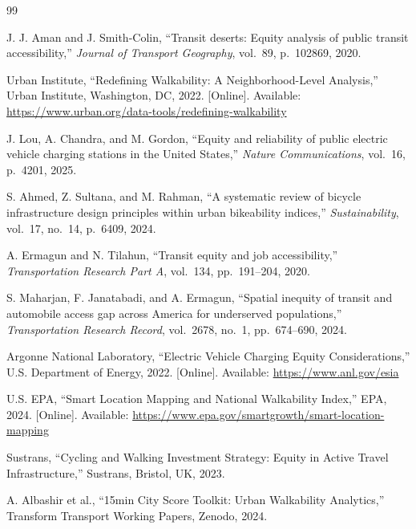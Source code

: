 \documentclass[11pt]{article}
\begin{document}
\small
\begin{thebibliography}{99}
\setlength{\itemsep}{1pt}

 J. J. Aman and J. Smith-Colin, ``Transit deserts: Equity analysis of public transit accessibility,'' \textit{Journal of Transport Geography}, vol.~89, p.~102869, 2020.

 Urban Institute, ``Redefining Walkability: A Neighborhood-Level Analysis,'' Urban Institute, Washington, DC, 2022. [Online]. Available: \url{https://www.urban.org/data-tools/redefining-walkability}

 J. Lou, A. Chandra, and M. Gordon, ``Equity and reliability of public electric vehicle charging stations in the United States,'' \textit{Nature Communications}, vol.~16, p.~4201, 2025.

 S. Ahmed, Z. Sultana, and M. Rahman, ``A systematic review of bicycle infrastructure design principles within urban bikeability indices,'' \textit{Sustainability}, vol.~17, no.~14, p.~6409, 2024.

 A. Ermagun and N. Tilahun, ``Transit equity and job accessibility,'' \textit{Transportation Research Part A}, vol.~134, pp.~191--204, 2020.

 S. Maharjan, F. Janatabadi, and A. Ermagun, ``Spatial inequity of transit and automobile access gap across America for underserved populations,'' \textit{Transportation Research Record}, vol.~2678, no.~1, pp.~674--690, 2024.

 Argonne National Laboratory, ``Electric Vehicle Charging Equity Considerations,'' U.S. Department of Energy, 2022. [Online]. Available: \url{https://www.anl.gov/esia}

 U.S. EPA, ``Smart Location Mapping and National Walkability Index,'' EPA, 2024. [Online]. Available: \url{https://www.epa.gov/smartgrowth/smart-location-mapping}

 Sustrans, ``Cycling and Walking Investment Strategy: Equity in Active Travel Infrastructure,'' Sustrans, Bristol, UK, 2023.

 A. Albashir et al., ``15min City Score Toolkit: Urban Walkability Analytics,'' Transform Transport Working Papers, Zenodo, 2024.


\end{thebibliography}
\end{document}
